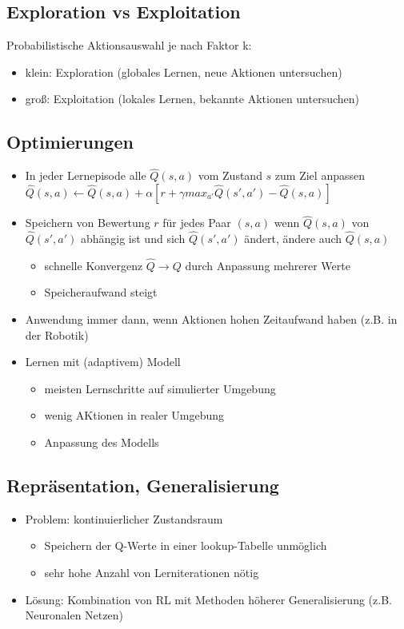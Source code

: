 \documentclass[paper=a4, fontsize=11pt]{scrartcl} %
\numberwithin{equation}{section} %
\numberwithin{figure}{section} %
\numberwithin{table}{section} %
\begin{document}
\subsection{Exploration vs Exploitation}

Probabilistische Aktionsauswahl je nach Faktor k:
\begin{itemize}
\item klein: Exploration (globales Lernen, neue Aktionen untersuchen)
\item groß: Exploitation (lokales Lernen, bekannte Aktionen untersuchen)
\end{itemize}

\subsection{Optimierungen}

\begin{itemize}
\item In jeder Lernepisode alle $\hat{Q}(s,a)$ vom Zustand $s$ zum Ziel anpassen $\hat{Q}(s,a) \leftarrow \hat{Q}(s,a) + \alpha [r+\gamma max_{a'} \hat{Q}(s',a')-\hat{Q}(s,a)]$
\item Speichern von Bewertung $r$ für jedes Paar $(s,a)$ wenn $\hat{Q}(s,a)$ von $\hat{Q}(s',a')$ abhängig ist und sich $\hat{Q}(s',a')$ ändert, ändere auch $\hat{Q}(s,a)$
\begin{itemize}
\item schnelle Konvergenz $\hat{Q} \rightarrow Q$ durch Anpassung mehrerer Werte
\item Speicheraufwand steigt
\end{itemize}
\item Anwendung immer dann, wenn Aktionen hohen Zeitaufwand haben (z.B. in der Robotik)
\item Lernen mit (adaptivem) Modell
\begin{itemize}
\item meisten Lernschritte auf simulierter Umgebung
\item wenig AKtionen in realer Umgebung
\item Anpassung des Modells
\end{itemize}
\end{itemize}

\subsection{Repräsentation, Generalisierung}

\begin{itemize}
\item Problem: kontinuierlicher Zustandsraum
\begin{itemize}
\item Speichern der Q-Werte in einer lookup-Tabelle unmöglich
\item sehr hohe Anzahl von Lerniterationen nötig
\end{itemize}
\item Lösung: Kombination von RL mit Methoden höherer Generalisierung (z.B. Neuronalen Netzen)
\end{itemize}
\end{document}
